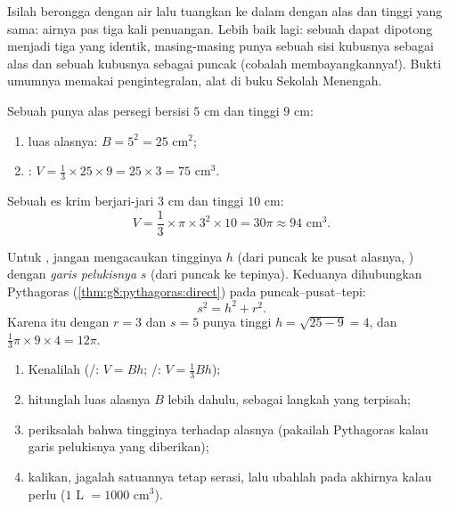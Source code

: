 \begin{remark}
Isilah  berongga dengan air lalu tuangkan ke dalam  dengan
alas dan tinggi yang sama: airnya pas tiga kali penuangan. Lebih baik
lagi: sebuah  dapat dipotong menjadi tiga  yang identik,
masing-masing punya sebuah sisi kubusnya sebagai alas dan sebuah  kubusnya sebagai puncak (cobalah membayangkannya!). Bukti
umumnya memakai pengintegralan, alat di buku Sekolah Menengah.
\end{remark}

\begin{example}\label{ex:g8:solids:volume}
Sebuah  punya alas persegi bersisi $5$ cm dan tinggi $9$ cm:
\begin{enumerate}
  \item luas alasnya: $B = 5^2 = 25$ cm$^2$;
  \item {}: $V = \frac13 \times 25 \times 9 = 25 \times 3 = 75$
        cm$^3$.
\end{enumerate}
Sebuah  es krim berjari-jari $3$ cm dan tinggi $10$ cm:
\[
V = \frac13 \times \pi \times 3^2 \times 10 = 30\pi \approx 94
\text{ cm}^3 .
\]
\end{example}

\begin{example}\label{ex:g8:solids:slant}
Untuk , jangan mengacaukan tingginya $h$ (dari puncak ke pusat
alasnya, ) dengan \emph{garis pelukisnya} $s$ (dari puncak
ke tepinya). Keduanya dihubungkan Pythagoras
(\cref{thm:g8:pythagoras:direct}) pada 
puncak--pusat--tepi:
\[
s^2 = h^2 + r^2 .
\]
Karena itu  dengan $r = 3$ dan $s = 5$ punya tinggi
$h = \sqrt{25 - 9} = 4$, dan 
$\frac13 \pi \times 9 \times 4 = 12\pi$.
\end{example}

\begin{method}\label{met:g8:solids:method}
\begin{enumerate}
  \item Kenalilah  (/: $V = Bh$;
        /: $V = \frac13 Bh$);
  \item hitunglah luas alasnya $B$ lebih dahulu, sebagai langkah yang
        terpisah;
  \item periksalah bahwa tingginya  terhadap alasnya
        (pakailah Pythagoras kalau garis pelukisnya yang diberikan);
  \item kalikan, jagalah satuannya tetap serasi, lalu ubahlah pada
        akhirnya kalau perlu ($1$ L $= 1000$ cm$^3$).
\end{enumerate}
\end{method}

